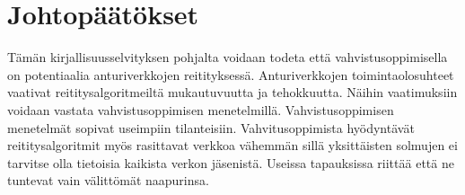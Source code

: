 \section{Johtopäätökset}
\label{sec:conclusion}

Tämän kirjallisuusselvityksen pohjalta voidaan todeta että vahvistusoppimisella
on potentiaalia anturiverkkojen reitityksessä. Anturiverkkojen
toimintaolosuhteet vaativat reititysalgoritmeiltä mukautuvuutta ja tehokkuutta.
Näihin vaatimuksiin voidaan vastata vahvistusoppimisen menetelmillä.
Vahvistusoppimisen menetelmät sopivat useimpiin tilanteisiin. Vahvitusoppimista
hyödyntävät reititysalgoritmit myös rasittavat verkkoa vähemmän sillä
yksittäisten solmujen ei tarvitse olla tietoisia kaikista verkon jäsenistä.
Useissa tapauksissa riittää että ne tuntevat vain välittömät naapurinsa.
